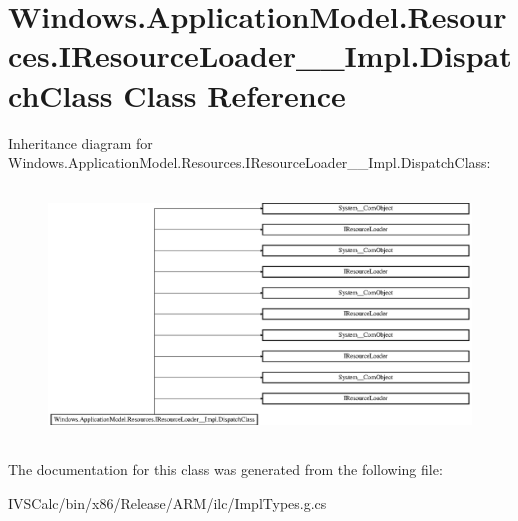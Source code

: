 \hypertarget{class_windows_1_1_application_model_1_1_resources_1_1_i_resource_loader_____impl_1_1_dispatch_class}{}\section{Windows.\+Application\+Model.\+Resources.\+I\+Resource\+Loader\+\_\+\+\_\+\+Impl.\+Dispatch\+Class Class Reference}
\label{class_windows_1_1_application_model_1_1_resources_1_1_i_resource_loader_____impl_1_1_dispatch_class}
Inheritance diagram for Windows.\+Application\+Model.\+Resources.\+I\+Resource\+Loader\+\_\+\+\_\+\+Impl.\+Dispatch\+Class\+:\begin{figure}[H]
\begin{center}
\leavevmode
\includegraphics[height=6.739606cm]{class_windows_1_1_application_model_1_1_resources_1_1_i_resource_loader_____impl_1_1_dispatch_class}
\end{center}
\end{figure}


The documentation for this class was generated from the following file\+:\begin{DoxyCompactItemize}
\item 
I\+V\+S\+Calc/bin/x86/\+Release/\+A\+R\+M/ilc/Impl\+Types.\+g.\+cs\end{DoxyCompactItemize}
